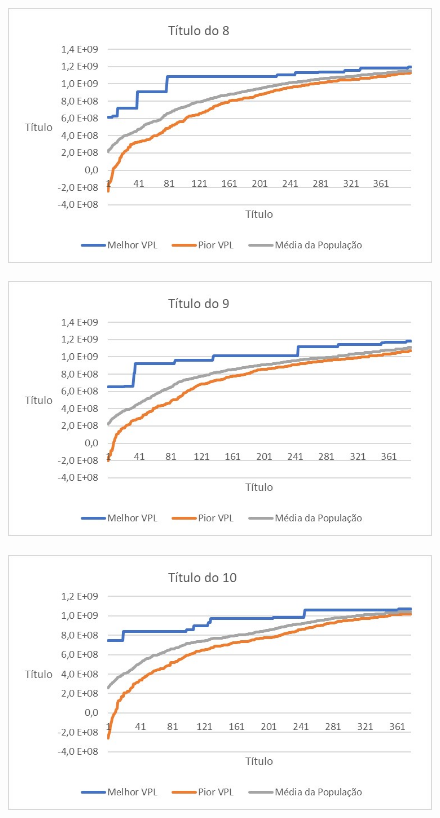 \documentclass[12pt,a4paper]{report}
\begin{document}
\begin{figure}[H]
\centering

\includegraphics[scale=1]{ApE/AGRPCO2/8}

\end{figure}

\begin{figure}[H]
\centering

\includegraphics[scale=1]{ApE/AGRPCO2/9}

\end{figure}

\begin{figure}[H]
\centering

\includegraphics[scale=1]{ApE/AGRPCO2/10}

\end{figure}
\end{document}
